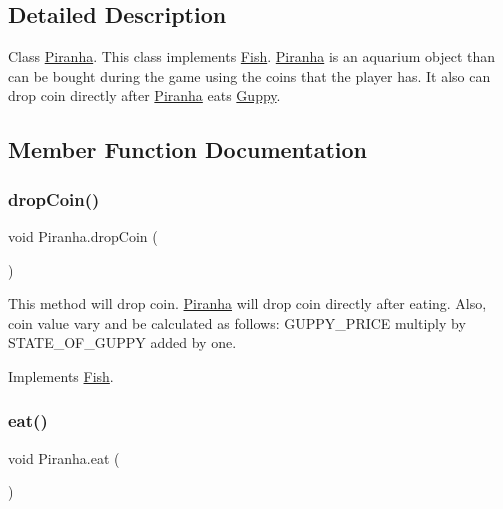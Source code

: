 \subsection{Detailed Description}
Class \mbox{\hyperlink{class_piranha}{Piranha}}. This class implements \mbox{\hyperlink{interface_fish}{Fish}}. \mbox{\hyperlink{class_piranha}{Piranha}} is an aquarium object than can be bought during the game using the coins that the player has. It also can drop coin directly after \mbox{\hyperlink{class_piranha}{Piranha}} eats \mbox{\hyperlink{class_guppy}{Guppy}}. 

\subsection{Member Function Documentation}
\mbox{\label{class_piranha_ac7d4af6cc29513e5bd351cbbaf25cc0b}} 
\subsubsection{\texorpdfstring{drop\+Coin()}{dropCoin()}}
{\footnotesize\ttfamily void Piranha.\+drop\+Coin (\begin{DoxyParamCaption}{ }\end{DoxyParamCaption})\hspace{0.3cm}{\ttfamily [inline]}}

This method will drop coin. \mbox{\hyperlink{class_piranha}{Piranha}} will drop coin directly after eating. Also, coin value vary and be calculated as follows\+: G\+U\+P\+P\+Y\+\_\+\+P\+R\+I\+CE multiply by S\+T\+A\+T\+E\+\_\+\+O\+F\+\_\+\+G\+U\+P\+PY added by one. 

Implements \mbox{\hyperlink{interface_fish_ad37facd4d5859411cf433520f03ae0b8}{Fish}}.

\mbox{\label{class_piranha_ac9bde9a286096cf199bdb1df5434a8c8}} 
\subsubsection{\texorpdfstring{eat()}{eat()}}
{\footnotesize\ttfamily void Piranha.\+eat (\begin{DoxyParamCaption}{ }\end{DoxyParamCaption})\hspace{0.3cm}{\ttfamily [inline]}}

